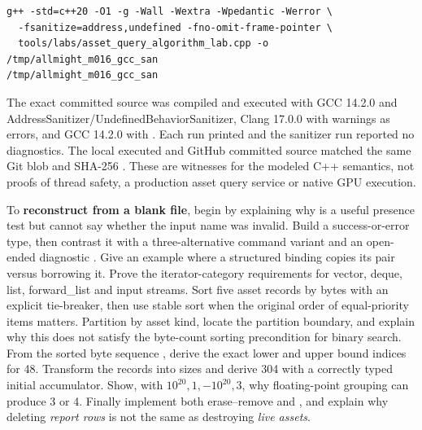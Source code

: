 \begin{verbatim}
g++ -std=c++20 -O1 -g -Wall -Wextra -Wpedantic -Werror \
  -fsanitize=address,undefined -fno-omit-frame-pointer \
  tools/labs/asset_query_algorithm_lab.cpp -o /tmp/allmight_m016_gcc_san
/tmp/allmight_m016_gcc_san
\end{verbatim}

The exact committed source was compiled and executed with GCC 14.2.0 and AddressSanitizer/UndefinedBehaviorSanitizer, Clang 17.0.0 with warnings as errors, and GCC 14.2.0 with . Each run printed  and the sanitizer run reported no diagnostics. The local executed and GitHub committed source matched the same Git blob  and SHA-256 . These are witnesses for the modeled C++ semantics, not proofs of thread safety, a production asset query service or native GPU execution.

To \textbf{reconstruct from a blank file}, begin by explaining why \BookInlineCode{optional\textless AssetHandle\textgreater{}} is a useful presence test but cannot say whether the input name was invalid. Build a success-or-error type, then contrast it with a three-alternative command variant and an open-ended diagnostic \BookInlineCode{any}. Give an example where a structured binding copies its pair versus borrowing it. Prove the iterator-category requirements for vector, deque, list, forward\_list and input streams. Sort five asset records by bytes with an explicit tie-breaker, then use stable sort when the original order of equal-priority items matters. Partition by asset kind, locate the partition boundary, and explain why this does not satisfy the byte-count sorting precondition for binary search. From the sorted byte sequence \BookInlineCode{{[}16,48,48,64,128{]}}, derive the exact lower and upper bound indices for 48. Transform the records into sizes and derive 304 with a correctly typed initial accumulator. Show, with \(10^{20},1,-10^{20},3\), why floating-point grouping can produce 3 or 4. Finally implement both erase--remove and , and explain why deleting \emph{report rows} is not the same as destroying \emph{live assets}.

